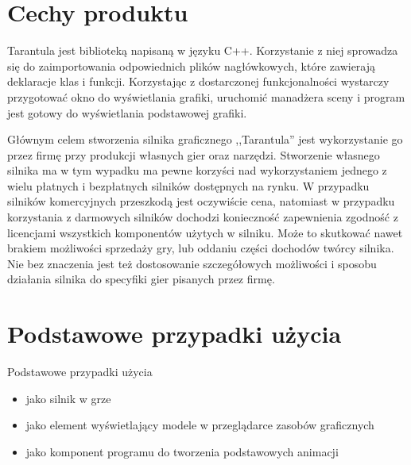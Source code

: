\documentclass[11pt,leqno]{article}
\begin{document}
\section{Cechy produktu}

Tarantula jest biblioteką napisaną w języku C++. Korzystanie z niej sprowadza się do zaimportowania odpowiednich plików nagłówkowych, 
które zawierają deklaracje klas i funkcji. Korzystając z dostarczonej funkcjonalności wystarczy przygotować okno do wyświetlania grafiki, 
uruchomić manadżera sceny i program jest gotowy do wyświetlania podstawowej grafiki.


Głównym celem stworzenia silnika graficznego ,,Tarantula'' jest wykorzystanie go przez firmę przy produkcji własnych gier oraz narzędzi. 
Stworzenie własnego silnika ma w tym wypadku ma pewne korzyści nad wykorzystaniem jednego z wielu płatnych i bezpłatnych silników 
dostępnych na rynku. W przypadku silników komercyjnych przeszkodą jest oczywiście cena, natomiast w przypadku korzystania z darmowych 
silników dochodzi konieczność zapewnienia zgodność z licencjami wszystkich komponentów użytych w silniku. Może to skutkować nawet 
brakiem możliwości sprzedaży gry, lub oddaniu części dochodów twórcy silnika. Nie bez znaczenia jest też dostosowanie szczegółowych 
możliwości i sposobu działania silnika do specyfiki gier pisanych przez firmę.

\section{Podstawowe przypadki użycia}
Podstawowe przypadki użycia
\begin{itemize}
\item jako silnik w grze
\item jako element wyświetlający modele w przeglądarce zasobów graficznych
\item jako komponent programu do tworzenia podstawowych animacji
\end{itemize}
\end{document}
